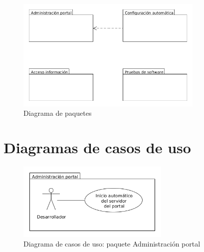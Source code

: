 \begin{figure}[!h]
  \begin{center}
  \includegraphics[width=0.8\textwidth]{imagenes/diagrama_paquetes.png}
  \caption{Diagrama de paquetes}
  \label{fig:diag_paquetes}
  \end{center}
\end{figure}
 
\section{Diagramas de casos de uso}

\begin{figure}[!h]
  \begin{center}
  \includegraphics[width=0.65\textwidth]{imagenes/diag_cu_ap.png}
  \caption{Diagrama de casos de uso: paquete Administración portal}
  \label{fig:diag_cu_ap}
  \end{center}
\end{figure}

